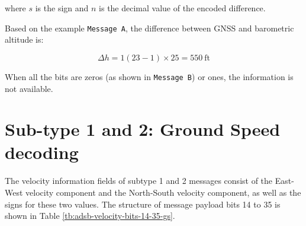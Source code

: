 where $s$ is the sign and $n$ is the decimal value of the encoded difference.

Based on the example \texttt{Message A}, the difference between GNSS and barometric altitude is:

\begin{equation}
  \Delta h = 1 (23 - 1) \times 25 = 550 ~\text{ft}
\end{equation}

When all the bits are zeros (as shown in \texttt{Message B}) or ones, the information is not available.


\section{Sub-type 1 and 2: Ground Speed decoding}

The velocity information fields of subtype 1 and 2 messages consist of the East-West velocity component and the North-South velocity component, as well as the signs for these two values. The structure of message payload bits 14 to 35 is shown in Table \ref{tb:adsb-velocity-bits-14-35-gs}.


